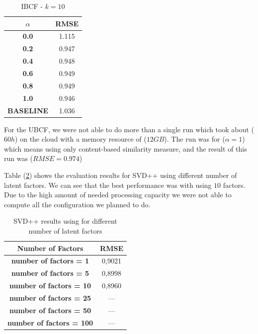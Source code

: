 \documentclass{sigish}
\begin{document}
\begin{table}[]
	\centering
	\begin{tabular}{|c|c|}
		\hline
		\textbf{$ \alpha $} & \textbf{RMSE} \\ \hline
		\textbf{0.0} & 1.115        \\ \hline
		\textbf{0.2} & 0.947        \\ \hline
		\textbf{0.4} & 0.948        \\ \hline
		\textbf{0.6} & 0.949        \\ \hline
		\textbf{0.8} & 0.949        \\ \hline
		\textbf{1.0} & 0.946        \\ \hline
		\textbf{BASELINE} & 1.036        \\ \hline
		
	\end{tabular}
	\caption{IBCF - $ k = 10 $}
	\label{tab:ibcf_results}
\end{table}

For the UBCF, we were not able to do more than a single run which took about ($ 60h $) on the cloud with a memory resource of ($ 12 GB $). The run was for ($ \alpha = 1 $) which means using only content-based similarity measure, and the result of this run was ($ RMSE = 0.974 $)

Table (\ref{tab:svd_results}) shows the evaluation results for SVD++ using different number of latent factors. We can see that the best performance was with using $ 10 $ factors.
Due to the high amount of needed processing capacity we were not able to compute all the configuration we planned to do.
\begin{table}[]
	\centering
	\begin{tabular}{|c|c|}
		\hline
		\textbf{Number of Factors}                  & \textbf{RMSE} \\ \hline
\textbf{number of factors = 1} & 0,9021        \\ \hline
\textbf{number of factors = 5} & 0,8998        \\ \hline
\textbf{number of factors  = 10} & 0,8960      \\ \hline
\textbf{number of factors  = 25} & ---        \\ \hline
\textbf{number of factors  = 50} & ---        \\ \hline
\textbf{number of factors  = 100} & ---        \\ \hline
	\end{tabular}
	\caption{SVD++ results using for different number of latent factors}
	\label{tab:svd_results}
\end{table}
\end{document}
